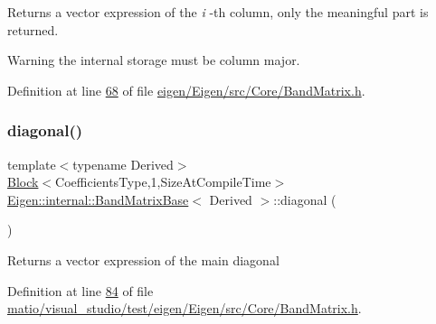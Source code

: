 \begin{DoxyReturn}{Returns}
a vector expression of the {\itshape i} -\/th column, only the meaningful part is returned. 
\end{DoxyReturn}
\begin{DoxyWarning}{Warning}
the internal storage must be column major. 
\end{DoxyWarning}


Definition at line \hyperlink{eigen_2_eigen_2src_2_core_2_band_matrix_8h_source_l00068}{68} of file \hyperlink{eigen_2_eigen_2src_2_core_2_band_matrix_8h_source}{eigen/\+Eigen/src/\+Core/\+Band\+Matrix.\+h}.

\mbox{\label{class_eigen_1_1internal_1_1_band_matrix_base_abce1c4d69e72ec594f67a841d1040606}} 
\subsubsection{\texorpdfstring{diagonal()}{diagonal()}\hspace{0.1cm}{\footnotesize\ttfamily [1/12]}}
{\footnotesize\ttfamily template$<$typename Derived$>$ \\
\hyperlink{group___core___module_class_eigen_1_1_block}{Block}$<$Coefficients\+Type,1,Size\+At\+Compile\+Time$>$ \hyperlink{class_eigen_1_1internal_1_1_band_matrix_base}{Eigen\+::internal\+::\+Band\+Matrix\+Base}$<$ Derived $>$\+::diagonal (\begin{DoxyParamCaption}{ }\end{DoxyParamCaption})\hspace{0.3cm}{\ttfamily [inline]}}

\begin{DoxyReturn}{Returns}
a vector expression of the main diagonal 
\end{DoxyReturn}


Definition at line \hyperlink{matio_2visual__studio_2test_2eigen_2_eigen_2src_2_core_2_band_matrix_8h_source_l00084}{84} of file \hyperlink{matio_2visual__studio_2test_2eigen_2_eigen_2src_2_core_2_band_matrix_8h_source}{matio/visual\+\_\+studio/test/eigen/\+Eigen/src/\+Core/\+Band\+Matrix.\+h}.

\mbox{\label{class_eigen_1_1internal_1_1_band_matrix_base_abce1c4d69e72ec594f67a841d1040606}} 
